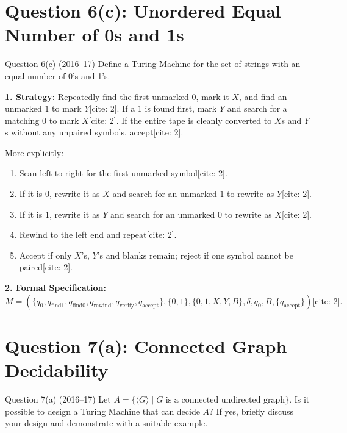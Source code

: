 \documentclass[11pt,a4paper]{article}
\begin{document}
\section{Question 6(c): Unordered Equal Number of 0s and 1s}
\begin{questionbox}{Question 6(c) (2016--17)}
Define a Turing Machine for the set of strings with an equal number of 0's and 1's.
\end{questionbox}

\begin{solutionbox}
\textbf{1. Strategy:}
Repeatedly find the first unmarked $0$, mark it $X$, and find an unmarked $1$ to mark $Y$[cite: 2]. If a $1$ is found first, mark $Y$ and search for a matching $0$ to mark $X$[cite: 2]. If the entire tape is cleanly converted to $X$s and $Y$s without any unpaired symbols, accept[cite: 2].

More explicitly:
\begin{enumerate}[leftmargin=*]
    \item Scan left-to-right for the first unmarked symbol[cite: 2].
    \item If it is $0$, rewrite it as $X$ and search for an unmarked $1$ to rewrite as $Y$[cite: 2].
    \item If it is $1$, rewrite it as $Y$ and search for an unmarked $0$ to rewrite as $X$[cite: 2].
    \item Rewind to the left end and repeat[cite: 2].
    \item Accept if only $X$'s, $Y$'s and blanks remain; reject if one symbol cannot be paired[cite: 2].
\end{enumerate}

\textbf{2. Formal Specification:}
$$M=(\{q_0,q_{\text{find1}},q_{\text{find0}},q_{\text{rewind}},q_{\text{verify}},q_{\text{accept}}\},
\{0,1\},\{0,1,X,Y,B\},\delta,q_0,B,\{q_{\text{accept}}\})\text{[cite: 2]}.$$
\end{solutionbox}

\section{Question 7(a): Connected Graph Decidability}
\begin{questionbox}{Question 7(a) (2016--17)}
Let $A = \{\langle G \rangle \mid G \text{ is a connected undirected graph}\}$. Is it possible to design a Turing Machine that can decide $A$? If yes, briefly discuss your design and demonstrate with a suitable example.
\end{questionbox}
\end{document}
